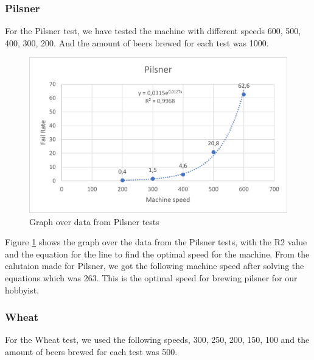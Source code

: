 \subsubsection{Pilsner}
For the Pilsner test, we have tested the machine with different speeds 600, 500, 400, 300, 200. And the amount of beers brewed for each test was 1000.

\begin{center}
    \centering
    \begin{figure}[H]
        \includegraphics[width=1\textwidth]{img/Pilsner_graph.png}
        \caption{Graph over data from Pilsner tests}
        \label{fig:Pilsner_graph}
    \end{figure}
\end{center}

Figure \ref{fig:Pilsner_graph} shows the graph over the data from the Pilsner tests, with the R2 value and the equation for the line to find the optimal speed for the machine. \newline
From the calutaion made for Pilsner, we got the following machine speed after solving the equations which was 263. This is the optimal speed for brewing pilsner for our hobbyist. \newline

\subsubsection{Wheat}
For the Wheat test, we used the following speeds, 300, 250, 200, 150, 100 and the amount of beers brewed for each test was 500.

